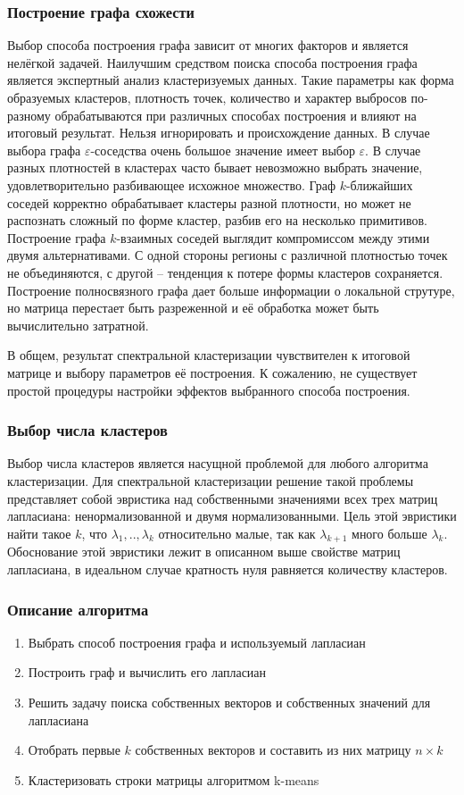 \subsubsection{Построение графа схожести}
Выбор способа построения графа зависит от многих факторов и является нелёгкой задачей. Наилучшим средством поиска способа построения графа является экспертный анализ кластеризуемых данных. Такие параметры как форма образуемых кластеров, плотность точек, количество и характер выбросов по-разному обрабатываются при различных способах построения и влияют на итоговый результат. Нельзя игнорировать и происхождение данных. В случае выбора графа $\varepsilon$-соседства очень большое значение имеет выбор $\varepsilon$. В случае разных плотностей в кластерах часто бывает невозможно выбрать значение, удовлетворительно разбивающее исхожное множество. Граф $k$-ближайших соседей корректно обрабатывает кластеры разной плотности, но может не распознать сложный по форме кластер, разбив его на несколько примитивов. Построение графа $k$-взаимных соседей выглядит компромиссом между этими двумя альтернативами. С одной стороны регионы с различной плотностью точек не объединяются, с другой -- тенденция к потере формы кластеров сохраняется. Построение полносвязного графа дает больше информации о локальной струтуре, но матрица перестает быть разреженной и её обработка может быть вычислительно затратной. 

В общем, результат спектральной кластеризации чувствителен к итоговой матрице и выбору параметров её построения. К сожалению, не существует простой процедуры настройки эффектов выбранного способа построения.

\subsubsection{Выбор числа кластеров}
Выбор числа кластеров является насущной проблемой для любого алгоритма кластеризации. Для спектральной кластеризации решение такой проблемы представляет собой эвристика над собственными значениями всех трех матриц лапласиана: ненормализованной и двумя нормализованными. Цель этой эвристики найти такое $k$, что $\lambda_1,..,\lambda_k$ относительно малые, так как $\lambda_{k+1}$ много больше $\lambda_k$. Обоснование этой эвристики лежит в описанном выше свойстве матриц лапласиана, в идеальном случае кратность нуля равняется количеству кластеров. 

\subsubsection{Описание алгоритма}
\begin{enumerate}
	\item Выбрать способ построения графа и используемый лапласиан
	\item Построить граф и вычислить его лапласиан
	\item Решить задачу поиска собственных векторов и собственных значений для лапласиана
	\item Отобрать первые $k$ собственных векторов и составить из них матрицу $n \times k$
	\item Кластеризовать строки матрицы алгоритмом k-means
\end{enumerate}
